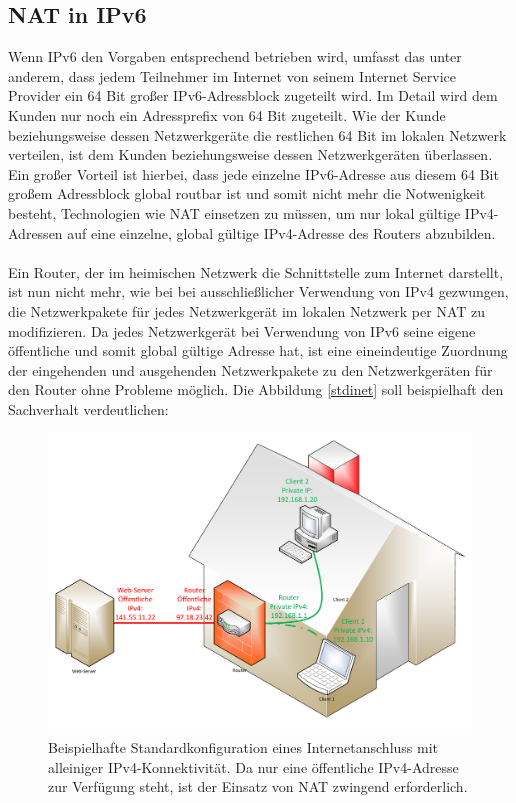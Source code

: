 \documentclass[a4paper,12pt]{scrartcl}
\begin{document}
\subsection{NAT in IPv6}
Wenn IPv6 den Vorgaben entsprechend betrieben wird, umfasst das unter anderem, dass jedem Teilnehmer im Internet von seinem Internet Service Provider ein 64 Bit gro{\ss}er  IPv6-Adressblock zugeteilt wird. Im Detail wird dem Kunden nur noch ein Adressprefix von 64 Bit zugeteilt. Wie der Kunde beziehungsweise dessen Netzwerkger\"ate die restlichen 64 Bit im lokalen Netzwerk verteilen, ist dem Kunden beziehungsweise dessen Netzwerkger\"aten  \"uberlassen. Ein gro{\ss}er Vorteil ist hierbei, dass jede einzelne IPv6-Adresse aus diesem 64 Bit gro{\ss}em Adressblock global routbar ist und somit nicht mehr die Notwenigkeit besteht, Technologien wie NAT einsetzen zu m\"ussen, um nur lokal g\"ultige IPv4-Adressen auf eine einzelne, global g\"ultige IPv4-Adresse des Routers abzubilden.\\
\\
Ein Router, der im heimischen Netzwerk die Schnittstelle zum Internet darstellt, ist nun nicht mehr, wie bei bei ausschließlicher Verwendung von IPv4 gezwungen, die Netzwerkpakete f\"ur jedes Netzwerkger\"at im lokalen Netzwerk per NAT zu modifizieren. Da jedes Netzwerkger\"at bei Verwendung von IPv6 seine eigene öffentliche und somit  global g\"ultige Adresse hat, ist eine eineindeutige Zuordnung der eingehenden und ausgehenden Netzwerkpakete zu den Netzwerkger\"aten f\"ur den Router ohne Probleme m\"oglich.  Die Abbildung \ref{stdinet} soll beispielhaft den Sachverhalt verdeutlichen:

\begin{figure}[htb]
\begin{center}
 \includegraphics[width=1\hsize]{./Zeichnungen/IPv4NAT.pdf}
 \end{center}
\caption[Beispielhafte Standardkonfiguration eines Internetanschluss mit alleiniger IPv4-Konnektivität. Da nur eine öffentliche IPv4-Adresse zur Verfügung steht, ist der Einsatz von NAT zwingend erforderlich. Quelle: Autor, verwendete Symbole unterliegen der
GPL]{\label{stdinetv4}Beispielhafte Standardkonfiguration eines Internetanschluss mit alleiniger IPv4-Konnektivität. Da nur eine öffentliche IPv4-Adresse zur Verfügung steht, ist der Einsatz von NAT zwingend erforderlich.}
\end{figure}
\end{document}
